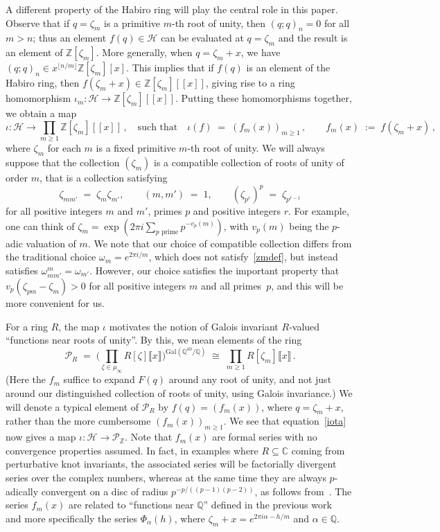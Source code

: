 \documentclass[12pt,reqno]{amsart}
\theoremstyle{definition}
\def\BZ{\mathbb Z}
\def\BQ{\mathbb Q}
\def\BC{\mathbb C}
\def\calP{\mathcal P}
\def\calH{\mathcal H}
\def\be{\begin{equation}}
\def\ee{\end{equation}}
\def\z{\zeta}
\def\={\;=\;}
\begin{document}
A different property of the Habiro ring will play the central role in this paper.
Observe that if $q=\z_m$
is a primitive $m$-th root of unity, then $(q;q)_n=0$ for all $m >n$; thus an
element $f(q) \in \calH$ can be evaluated at $q=\z_m$ and the result is an element
of $\BZ[\z_m]$. More generally, when $q=\z_m+x$, we have
$(q;q)_n \in x^{\lfloor{n/m\rfloor}}\BZ[\z_m][x]$.
This implies that if $f(q)$ is an element of the Habiro ring, then
$f(\z_m+x) \in \BZ[\z_m][\![x]\!]$, giving rise to a ring homomorphism 
$\iota_m: \calH \to \BZ[\z_m][\![x]\!]$. Putting these homomorphisms together,
we obtain a map 
\be
\label{iota}
\iota: \calH \to \prod_{m\geq1}\BZ[\z_m][\![x]\!]\,,
\quad\text{such that}\quad
\iota(f) \= (f_m(x))_{m \geq 1}\,,
\qquad f_m(x)\;:=\;f(\z_m+x) \,,
\ee
where $\z_m$ for each $m$ is a fixed primitive $m$-th root of unity. We will
always suppose that the collection $(\z_m)$ is a compatible collection of roots
of unity of order $m$, that is a collection satisfying
\be
\label{zmdef}
\z_{mm'} \=\z_m\z_{m'}, \qquad (m,m')\=1, \qquad
(\z_{p^r})^p \=\z_{p^{r-1}}
\ee
for all positive integers $m$ and $m'$, primes $p$ and positive integers $r$.
For example, one can think of $\z_m=\exp(2\pi i\sum_{p\text{ prime}}p^{-v_{p}(m)})$,
with $v_p(m)$ being the $p$-adic valuation of $m$. 
We note that our choice of compatible collection differs from the traditional
choice $\omega_m=e^{2\pi i/m}$, which does not satisfy~\eqref{zmdef}, but instead
satisfies $\omega_{mm'}^m=\omega_{m'}$. However, our choice satisfies the important
property that $v_p(\z_{pm}-\z_m)>0$ for all positive integers $m$ and all
primes~$p$, and this will be more convenient for us.

For a ring $R$, the map $\iota$ motivates the notion of Galois invariant
$R$-valued ``functions near roots of unity''. By this, we mean elements of the ring 
\be
\label{PR}
\calP_{R}
\=
\Big(\prod_{\z\in\mu_{\infty}} R[\z]
\llbracket x\rrbracket\Big)^{\mathrm{Gal}(\BQ^{\mathrm{ab}}/\BQ)}
\;\cong\; \prod_{m\geq 1} R[\z_m]\llbracket x\rrbracket\,.
\ee
(Here the $f_m$ suffice to expand $F(q)$
around any root of unity, and not just around our distinguished collection of
roots of unity, using Galois invariance.)
We will denote a typical element of $\calP_R$ by $f(q)=(f_m(x))$, where $q=\z_m+x$,
rather than the more cumbersome $(f_m(x))_{m \geq 1}$.
We see that equation~\eqref{iota} now
gives a map $\iota:\calH\to\calP_\BZ$. Note that $f_m(x)$ are formal series with
no convergence properties assumed. In fact, in examples where $R\subseteq\BC$
coming from perturbative knot invariants, the associated series
will be factorially divergent series over the complex numbers, whereas at the same
time they are always $p$-adically convergent on a disc of radius $p^{-p/((p-1)(p-2))}$,
as follows from~\cite[Thm.9.1, Thm.9.2]{GZ:kashaev}.
The series $f_m(x)$ are related to ``functions near $\BQ$'' defined in the
previous work~\cite{GZ:kashaev} and more specifically the series $\Phi_{\alpha}(h)$,
where $\z_m+x=e^{2\pi i\alpha-h/m}$ and $\alpha \in \BQ$.
\end{document}
